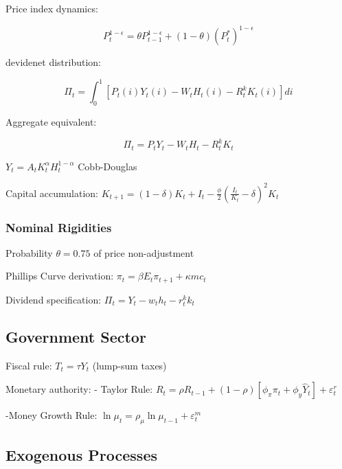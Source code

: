 \documentclass[11pt,preprint]{elsarticle}
\numberwithin{equation}{section}
\numberwithin{figure}{section}
\numberwithin{table}{section}
\begin{document}
Price index dynamics:

\begin{equation}
P_t^{1-\epsilon} = \theta P_{t-1}^{1-\epsilon} + (1-\theta)(P_t^*)^{1-\epsilon}
\label{price_index}
\end{equation}

devidenet distribution:

\begin{equation}
\Pi_t = \int_0^1 \left[ P_t(i)Y_t(i) - W_t H_t(i) - R_t^k K_t(i) \right] di
\label{dividends}
\end{equation}

Aggregate equivalent:

\begin{equation}
\Pi_t = P_t Y_t - W_t H_t - R_t^k K_t
\label{agg_dividends}
\end{equation}

\(Y_t = A_t K_t^\alpha H_t^{1-\alpha}\) Cobb-Douglas

Capital accumulation:
\(K_{t+1} = (1-\delta)K_t + I_t - \frac{\phi}{2}\left(\frac{I_t}{K_t} - \delta\right)^2 K_t\)

\subsubsection{Nominal Rigidities}\label{nominal-rigidities}

Probability \(\theta=0.75\) of price non-adjustment

Phillips Curve derivation: \(\pi_t = \beta E_t\pi_{t+1} + \kappa mc_t\)

Dividend specification: \(\Pi_t = Y_t - w_t h_t - r_t^k k_t\)

\subsection{Government Sector}\label{government-sector}

Fiscal rule: \(T_t = \tau Y_t\) (lump-sum taxes)

Monetary authority: - Taylor Rule:
\(R_t = \rho R_{t-1} + (1-\rho)[\phi_\pi \pi_t + \phi_y \hat{Y}_t] + \varepsilon_t^r\)

-Money Growth Rule:
\(\ln \mu_t = \rho_\mu \ln \mu_{t-1} + \varepsilon_t^m\)

\subsection{Exogenous Processes}\label{exogenous-processes}
\end{document}
